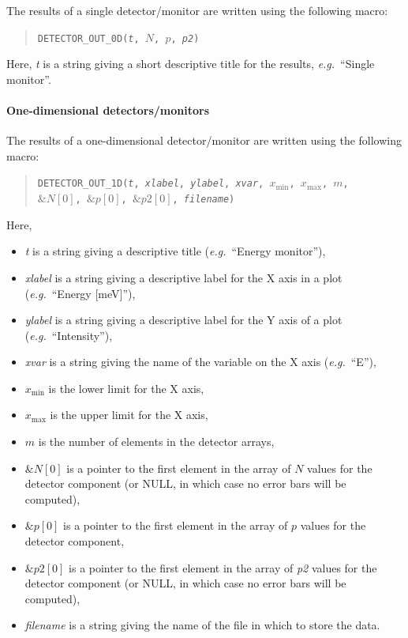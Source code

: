 The results of a single detector/monitor are written using the following
macro:
\begin{quote}
  \texttt{DETECTOR\_OUT\_0D(\textit{t}, $N$, $p$, \textit{p2})}
\end{quote}
Here, \textit{t} is a string giving a short descriptive title for the
results, {\em e.g.}\ ``Single monitor''.


\paragraph{One-dimensional detectors/monitors}

The results of a one-dimensional detector/\discretionary{}{}{}mon\-i\-tor are written using the
following macro:
\begin{quote}
  \texttt{DETECTOR\_OUT\_1D(\textit{t},
        \textit{xlabel},
        \textit{ylabel},
        \textit{xvar}, $x_\mathrm{min}$, $x_\mathrm{max}$, $m$, \\
          $\&N[0]$, $\&p[0]$, $\&\textit{p2}[0]$,
        \textit{filename})}
\end{quote}
Here,
\begin{itemize}
\item \textit{t} is a string giving a descriptive title ({\em e.g.}\ ``Energy
  monitor''),
\item \textit{xlabel} is a string giving a descriptive label for the X
  axis in a plot ({\em e.g.}\ ``Energy [meV]''),
\item \textit{ylabel} is a string giving a descriptive label for the Y
  axis of a plot ({\em e.g.}\ ``Intensity''),
\item \textit{xvar} is a string giving the name of the variable on the X
  axis ({\em e.g.}\ ``E''),
\item $x_\mathrm{min}$ is the lower limit for the X axis,
\item $x_\mathrm{max}$ is the upper limit for the X axis,
\item $m$ is the number of elements in the detector arrays,
\item $\&N[0]$ is a pointer to the first element in the array of $N$
  values for the detector component (or NULL, in which case no error
  bars will be computed),
\item $\&p[0]$ is a pointer to the first element in the array of $p$
  values for the detector component,
\item $\&\textit{p2}[0]$ is a pointer to the first element in the array of
  \textit{p2} values for the detector component (or NULL, in which case no error
  bars will be computed),
\item \textit{filename} is a string giving the name of the file in which
  to store the data.
\end{itemize}



